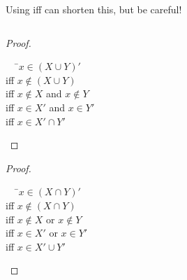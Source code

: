 \documentclass[../notes.tex]{subfiles}
\begin{document}
			Using iff can shorten this, but be careful!
			\begin{example}
				$ $\\
				\begin{minipage}{0.4\textwidth}
					\begin{proof}
						$ $
						\begin{tabbing}
							$\quad$ \=$x \in (X \cup Y)'$\\
							iff \>$x \notin (X \cup Y)$\\
							iff \>$x \notin X$ and $x \notin Y$\\
							iff \>$x \in X'$ and $x \in Y'$\\
							iff \>$x \in X' \cap Y'$
						\end{tabbing}
					\end{proof}
				\end{minipage}
				\hfill
				\begin{minipage}{0.4\textwidth}
					\begin{proof}
						$ $ 
						\begin{tabbing}
							$\quad$ \=$x \in (X \cap Y)'$\\
							iff \> $x \notin (X \cap Y)$\\
							iff \> $x \notin X$ or $x \notin Y$\\
							iff \> $x \in X'$ or $x \in Y'$\\
							iff \> $x \in X' \cup Y'$
						\end{tabbing}
					\end{proof}
				\end{minipage}
			\end{example}
			\pagebreak
\end{document}
